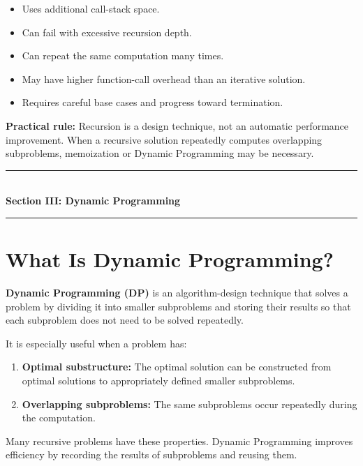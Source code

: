 \begin{itemize}
    \item Uses additional call-stack space.
    \item Can fail with excessive recursion depth.
    \item Can repeat the same computation many times.
    \item May have higher function-call overhead than an iterative solution.
    \item Requires careful base cases and progress toward termination.
\end{itemize}

\textbf{Practical rule:} Recursion is a design technique, not an automatic performance improvement. When a recursive solution repeatedly computes overlapping subproblems, memoization or Dynamic Programming may be necessary.


\newpage
\begin{center}
\vspace{0.5em}
{\color{primary}\rule{0.45\textwidth}{1.2pt}}\\[4pt]
{\Large\bfseries\color{primary} Section III: Dynamic Programming}\\[2pt]
{\color{primary}\rule{0.45\textwidth}{1.2pt}}
\vspace{0.5em}
\end{center}


\section{What Is Dynamic Programming?}

\textbf{Dynamic Programming (DP)} is an algorithm-design technique that solves a problem by dividing it into smaller subproblems and storing their results so that each subproblem does not need to be solved repeatedly.

It is especially useful when a problem has:

\begin{enumerate}
    \item \textbf{Optimal substructure:} The optimal solution can be constructed from optimal solutions to appropriately defined smaller subproblems.
    \item \textbf{Overlapping subproblems:} The same subproblems occur repeatedly during the computation.
\end{enumerate}

Many recursive problems have these properties. Dynamic Programming improves efficiency by recording the results of subproblems and reusing them.

